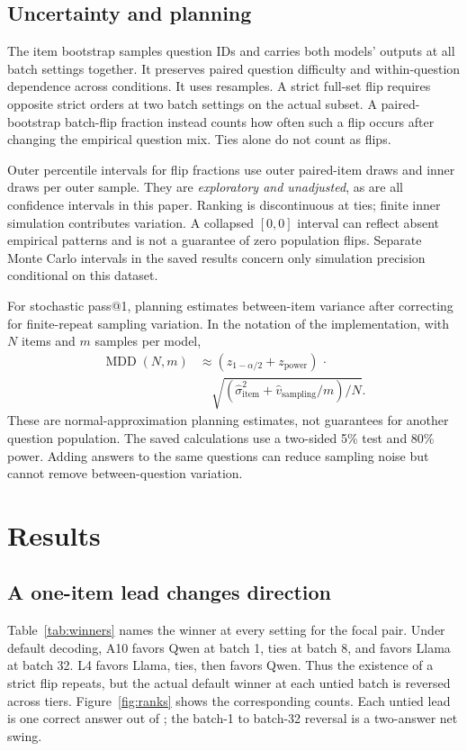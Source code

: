 \documentclass[10pt,twocolumn]{article}
\begin{document}
\subsection{Uncertainty and planning}
The item bootstrap samples question IDs and carries both models' outputs at all batch settings together. It preserves paired question difficulty and within-question dependence across conditions. It uses \BootstrapCount{} resamples. A strict full-set flip requires opposite strict orders at two batch settings on the actual subset. A paired-bootstrap batch-flip fraction instead counts how often such a flip occurs after changing the empirical question mix. Ties alone do not count as flips.

Outer percentile intervals for flip fractions use \OuterCount{} outer paired-item draws and \InnerCount{} inner draws per outer sample. They are \emph{exploratory and unadjusted}, as are all confidence intervals in this paper. Ranking is discontinuous at ties; finite inner simulation contributes variation. A collapsed $[0,0]$ interval can reflect absent empirical patterns and is not a guarantee of zero population flips. Separate Monte Carlo intervals in the saved results concern only simulation precision conditional on this dataset.

For stochastic pass@1, planning estimates between-item variance after correcting for finite-repeat sampling variation. In the notation of the implementation, with $N$ items and $m$ samples per model,
\begin{equation}
\begin{aligned}
\operatorname{MDD}(N,m)&\approx(z_{1-\alpha/2}+z_{\mathrm{power}})\,\cdot\\
&\quad\sqrt{(\hat\sigma_{\mathrm{item}}^2+\hat v_{\mathrm{sampling}}/m)/N}.
\end{aligned}
\end{equation}
These are normal-approximation planning estimates, not guarantees for another question population. The saved calculations use a two-sided 5\% test and 80\% power. Adding answers to the same questions can reduce sampling noise but cannot remove between-question variation.

\section{Results}
\subsection{A one-item lead changes direction}
Table~\ref{tab:winners} names the winner at every setting for the focal pair. Under default decoding, A10 favors Qwen at batch 1, ties at batch 8, and favors Llama at batch 32. L4 favors Llama, ties, then favors Qwen. Thus the existence of a strict flip repeats, but the actual default winner at each untied batch is reversed across tiers. Figure~\ref{fig:ranks} shows the corresponding counts. Each untied lead is one correct answer out of \NItems{}; the batch-1 to batch-32 reversal is a two-answer net swing.
\end{document}
